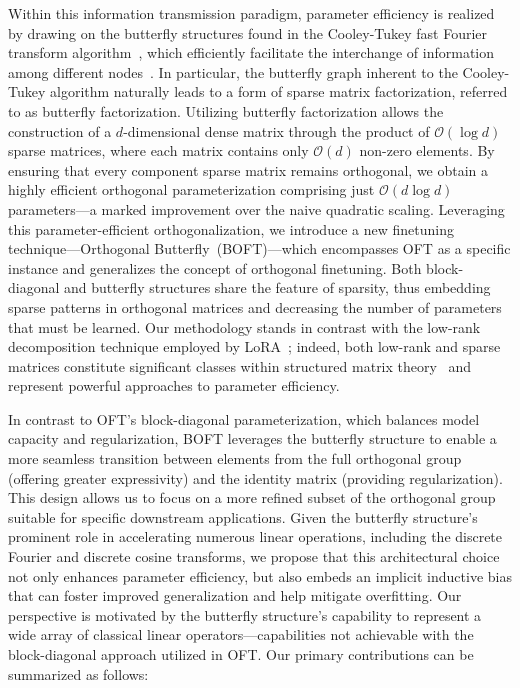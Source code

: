 Within this information transmission paradigm, parameter efficiency is realized by drawing on the butterfly structures found in the Cooley-Tukey fast Fourier transform algorithm~\cite{cooley1965algorithm}, which efficiently facilitate the interchange of information among different nodes~\cite{klasing1994broadcasting}. In particular, the butterfly graph inherent to the Cooley-Tukey algorithm naturally leads to a form of sparse matrix factorization, referred to as butterfly factorization. Utilizing butterfly factorization allows the construction of a $d$-dimensional dense matrix through the product of $\mathcal{O}(\log d)$ sparse matrices, where each matrix contains only $\mathcal{O}(d)$ non-zero elements. By ensuring that every component sparse matrix remains orthogonal, we obtain a highly efficient orthogonal parameterization comprising just $\mathcal{O}(d\log d)$ parameters—a marked improvement over the naive quadratic scaling. Leveraging this parameter-efficient orthogonalization, we introduce a new finetuning technique—Orthogonal Butterfly~(BOFT)—which encompasses OFT as a specific instance and generalizes the concept of orthogonal finetuning. Both block-diagonal and butterfly structures share the feature of sparsity, thus embedding sparse patterns in orthogonal matrices and decreasing the number of parameters that must be learned. Our methodology stands in contrast with the low-rank decomposition technique employed by LoRA~\cite{hulora2022}; indeed, both low-rank and sparse matrices constitute significant classes within structured matrix theory~\cite{candes2011robust} and represent powerful approaches to parameter efficiency.

In contrast to OFT's block-diagonal parameterization, which balances model capacity and regularization, BOFT leverages the butterfly structure to enable a more seamless transition between elements from the full orthogonal group (offering greater expressivity) and the identity matrix (providing regularization). This design allows us to focus on a more refined subset of the orthogonal group suitable for specific downstream applications. Given the butterfly structure’s prominent role in accelerating numerous linear operations, including the discrete Fourier and discrete cosine transforms, we propose that this architectural choice not only enhances parameter efficiency, but also embeds an implicit inductive bias that can foster improved generalization and help mitigate overfitting. Our perspective is motivated by the butterfly structure’s capability to represent a wide array of classical linear operators—capabilities not achievable with the block-diagonal approach utilized in OFT. Our primary contributions can be summarized as follows:

